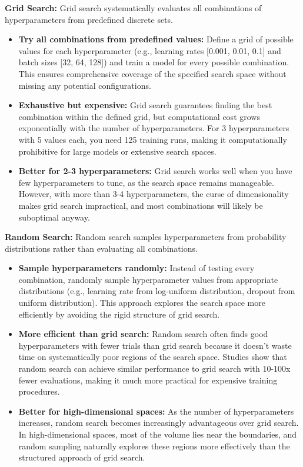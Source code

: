 \textbf{Grid Search:} Grid search systematically evaluates all combinations of hyperparameters from predefined discrete sets.
\begin{itemize}
    \item \textbf{Try all combinations from predefined values:} Define a grid of possible values for each hyperparameter (e.g., learning rates [0.001, 0.01, 0.1] and batch sizes [32, 64, 128]) and train a model for every possible combination. This ensures comprehensive coverage of the specified search space without missing any potential configurations.
    
    \item \textbf{Exhaustive but expensive:} Grid search guarantees finding the best combination within the defined grid, but computational cost grows exponentially with the number of hyperparameters. For 3 hyperparameters with 5 values each, you need 125 training runs, making it computationally prohibitive for large models or extensive search spaces.
    
    \item \textbf{Better for 2-3 hyperparameters:} Grid search works well when you have few hyperparameters to tune, as the search space remains manageable. However, with more than 3-4 hyperparameters, the curse of dimensionality makes grid search impractical, and most combinations will likely be suboptimal anyway.
\end{itemize}

\textbf{Random Search:} Random search samples hyperparameters from probability distributions rather than evaluating all combinations.
\begin{itemize}
    \item \textbf{Sample hyperparameters randomly:} Instead of testing every combination, randomly sample hyperparameter values from appropriate distributions (e.g., learning rate from log-uniform distribution, dropout from uniform distribution). This approach explores the search space more efficiently by avoiding the rigid structure of grid search.
    
    \item \textbf{More efficient than grid search:} Random search often finds good hyperparameters with fewer trials than grid search because it doesn't waste time on systematically poor regions of the search space. Studies show that random search can achieve similar performance to grid search with 10-100x fewer evaluations, making it much more practical for expensive training procedures.
    
    \item \textbf{Better for high-dimensional spaces:} As the number of hyperparameters increases, random search becomes increasingly advantageous over grid search. In high-dimensional spaces, most of the volume lies near the boundaries, and random sampling naturally explores these regions more effectively than the structured approach of grid search.
\end{itemize}

